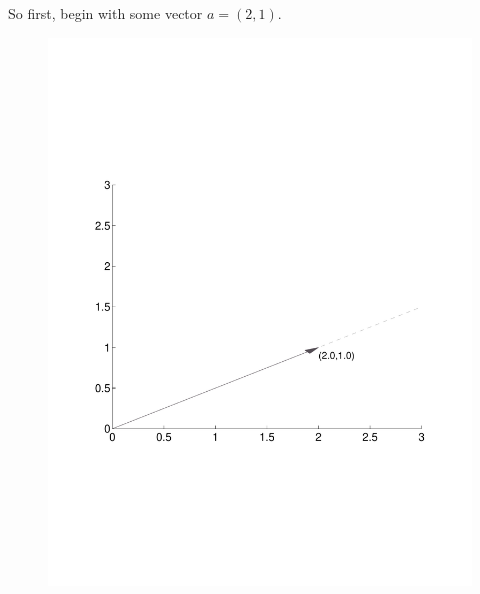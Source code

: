 \documentclass[12pt]{article}
\theoremstyle{plain}
\theoremstyle{definition}
\theoremstyle{remark}
\begin{document}
So first, begin with some vector $a=(2,1)$.
\begin{figure}[htpb!]
  \centering
  \includegraphics[scale=0.5, trim={2cm, 7cm, 2cm, 7cm}, clip]{Plots/StateSpaceGeometry1.pdf}
\end{figure}
\end{document}
